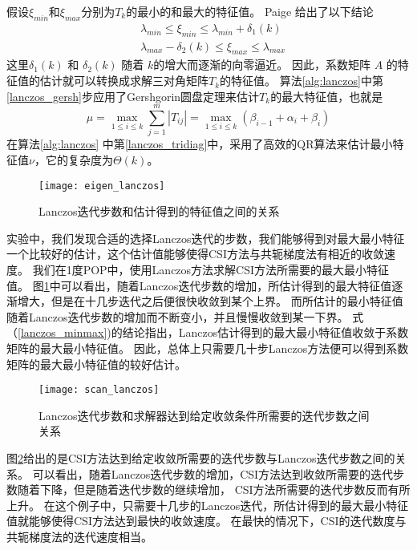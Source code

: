 假设$\xi_{min}$和$\xi_{max}$分别为$T_k$的最小的和最大的特征值。
Paige\cite{Paige1980235} 给出了以下结论
\begin{equation}\label{lanczos_minmax}
\begin{aligned} 
&\lambda_{min} \le \xi_{min} \le \lambda_{min}+\delta_1(k) \\
&\lambda_{max}-\delta_2(k)  \le \xi_{max} \le \lambda_{max}
\end{aligned}
\end{equation}
这里$\delta_1(k)$ 和 $\delta_2(k)$ 随着 $k$的增大而逐渐的向零逼近。 因此，系数矩阵 $A$ 的特征值的估计就可以转换成求解三对角矩阵$T_k$的特征值。 
算法\ref{alg:lanczos}中第\ref{lanczos_gersh}步应用了Gershgorin圆盘定理来估计$T_k$的最大特征值，也就是 
\begin{equation}
\mu = \max_{1 \le i \le k}\sum^m_{j=1}|T_{ij}|=\max_{1 \le i \le k}(\beta_{i-1}+\alpha_i +\beta_{i})
\end{equation}
在算法\ref{alg:lanczos} 中第\ref{lanczos_tridiag}中，采用了高效的QR算法\cite{ortega1963llt}来估计最小特征值$\nu$，它的复杂度为$\Theta(k)$。
 
\begin {figure}%
\centering
\texttt{[image: eigen\_lanczos]}
\caption[] {Lanczos迭代步数和估计得到的特征值之间的关系\label{fig:lanczos_eigs}}
\end{figure}
实验中，我们发现合适的选择Lanczos迭代的步数，我们能够得到对最大最小特征一个比较好的估计，这个估计值能够使得CSI方法与共轭梯度法有相近的收敛速度。  
我们在1度POP中，使用Lanczos方法求解CSI方法所需要的最大最小特征值。 
图\ref{fig:lanczos_eigs}中可以看出，随着Lanczos迭代步数的增加，所估计得到的最大特征值逐渐增大，但是在十几步迭代之后便很快收敛到某个上界。
而所估计的最小特征值随着Lanczos迭代步数的增加而不断变小，并且慢慢收敛到某一下界。 
式（\ref{lanczos_minmax})的结论指出，Lanczos估计得到的最大最小特征值收敛于系数矩阵的最大最小特征值。
因此，总体上只需要几十步Lanczos方法便可以得到系数矩阵的最大最小特征值的较好估计。

\begin {figure}%
\centering
\texttt{[image: scan\_lanczos]}
\caption[] {Lanczos迭代步数和求解器达到给定收敛条件所需要的迭代步数之间关系\label{fig:lanczos_iter}}
\end{figure}
图\ref{fig:lanczos_iter}给出的是CSI方法达到给定收敛所需要的迭代步数与Lanczos迭代步数之间的关系。
可以看出，随着Lanczos迭代步数的增加，CSI方法达到收敛所需要的迭代步数随着下降，但是随着迭代步数的继续增加， CSI方法所需要的迭代步数反而有所上升。 
在这个例子中，只需要十几步的Lanczos迭代，所估计得到的最大最小特征值就能够使得CSI方法达到最快的收敛速度。
在最快的情况下，CSI的迭代数度与共轭梯度法的迭代速度相当。


